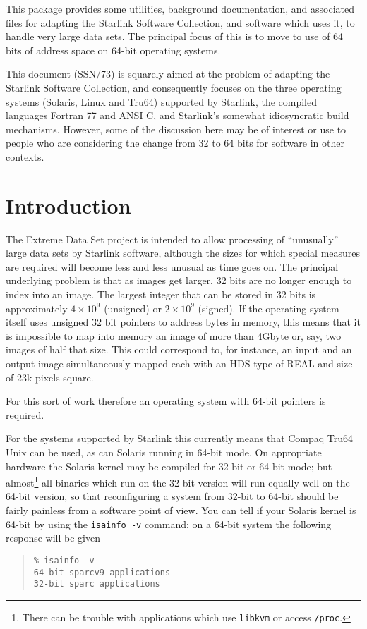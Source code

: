 \documentclass[twoside,11pt]{article}
\newcommand{\stardocinitials}  {SSN}
\newcommand{\stardocnumber}    {73.2 (draft)}
\newcommand{\stardocabstract}  {
This package provides some utilities, background documentation,
and associated files
for adapting the Starlink Software Collection, and software which uses it, 
to handle very large data sets.
The principal focus of this is to move to use of 64 bits of address
space on 64-bit operating systems.

This document (SSN/73) is squarely aimed at the problem of adapting the 
Starlink Software Collection, and consequently focuses on 
the three operating systems (Solaris, Linux and Tru64) supported by Starlink,
the compiled languages Fortran 77 and ANSI C, 
and Starlink's somewhat idiosyncratic build mechanisms. 
However, some of the discussion here may be of interest or use to 
people who are considering the change from 32 to 64 bits for
software in other contexts.
}
\newcommand{\stardocname}{\stardocinitials /\stardocnumber}
\newenvironment{latexonly}{}{}
\renewcommand{\_}{\texttt{\symbol{95}}}
\newcommand{\file}[1]{{\tt #1}}
\newenvironment{squote}{\begin{quote}\begin{small}}{\end{small}\end{quote}}
\renewcommand{\thepage}{\roman{page}}
\begin{document}
\stardocabstract
  \newpage
  \begin{latexonly}
    \setlength{\parskip}{0mm}
    \tableofcontents
    \setlength{\parskip}{\medskipamount}
    \markboth{\stardocname}{\stardocname}
  \end{latexonly}
\cleardoublepage
\renewcommand{\thepage}{\arabic{page}}
\setcounter{page}{1}




\section{Introduction}

The Extreme Data Set project is intended to allow processing of ``unusually''
large data sets by Starlink software, 
although the sizes for which special measures
are required will become less and less unusual as time goes on.
The principal underlying problem is that as images get larger,
32 bits are no longer enough to index into an image.
The largest integer that can be stored in 32 bits 
is approximately $4 \times 10^9$ (unsigned) or $2 \times 10^9$ (signed).
If the operating system itself uses unsigned 32 bit pointers to 
address bytes
in memory, this means that it is impossible to map into memory 
an image of more
than 4Gbyte or, say, two images of half that size. 
This could correspond to, for instance, an input and an output image
simultaneously mapped each with an HDS type of \_REAL and 
size of 23k pixels square.

For this sort of work therefore an operating system with 64-bit 
pointers is required.

For the systems supported by
Starlink this currently means that Compaq Tru64 Unix can be used,
as can Solaris running in 64-bit mode.  
On appropriate hardware the Solaris kernel 
may be compiled for 32 bit or 64 bit mode;
but almost\footnote{
   There can be trouble with applications which use 
   \file{libkvm} or access \file{/proc}.}
all binaries which run on the 32-bit version
will run equally well on the 64-bit version, 
so that reconfiguring a system from 32-bit to 64-bit should be
fairly painless from a software point of view.
You can tell if your Solaris kernel is 64-bit 
by using the \file{isainfo -v} command; on a 64-bit system the
following response will be given
\begin{squote}
\begin{verbatim}
% isainfo -v
64-bit sparcv9 applications
32-bit sparc applications
\end{verbatim}
\end{squote}
\end{document}
